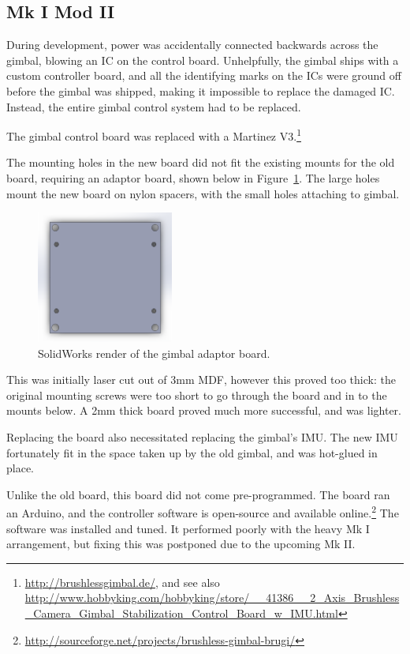\documentclass[12pt,oneside,a4paper]{book}
\begin{document}
\subsection{Mk I Mod II}
\label{sec:mk-ib}

During development, power was accidentally connected backwards across
the gimbal, blowing an \gls{IC} on the control board. Unhelpfully, the
gimbal ships with a custom controller board, and all the identifying
marks on the ICs were ground off before the gimbal was shipped, making
it impossible to replace the damaged IC. Instead, the entire gimbal
control system had to be replaced.

The gimbal control board was replaced with a Martinez
V3.\footnote{\url{http://brushlessgimbal.de/}, and see also \url{http://www.hobbyking.com/hobbyking/store/__41386__2_Axis_Brushless_Camera_Gimbal_Stabilization_Control_Board_w_IMU.html}}

The mounting holes in the new board did not fit the existing mounts
for the old board, requiring an adaptor board, shown below in
Figure~\ref{fig:gmb}. The large holes mount the new board on nylon
spacers, with the small holes attaching to gimbal.

\begin{figure}[h]
  \centering
  \includegraphics[width=0.4\textwidth]{figs/gmb}
  \caption{SolidWorks render of the gimbal adaptor board.}
  \label{fig:gmb}
\end{figure}

This was initially laser cut out of 3mm \gls{MDF}, however this proved too
thick: the original mounting screws were too short to go through the
board and in to the mounts below. A 2mm thick board proved much more
successful, and was lighter.
 
Replacing the board also necessitated replacing the gimbal's
\gls{IMU}. The new IMU fortunately fit in the space taken up by the
old gimbal, and was hot-glued in place.

Unlike the old board, this board did not come pre-programmed. The
board ran an Arduino, and the controller software is open-source and
available
online.\footnote{\url{http://sourceforge.net/projects/brushless-gimbal-brugi/}}
The software was installed and tuned. It performed poorly with the
heavy Mk I arrangement, but fixing this was postponed due to the
upcoming Mk II.
\end{document}
